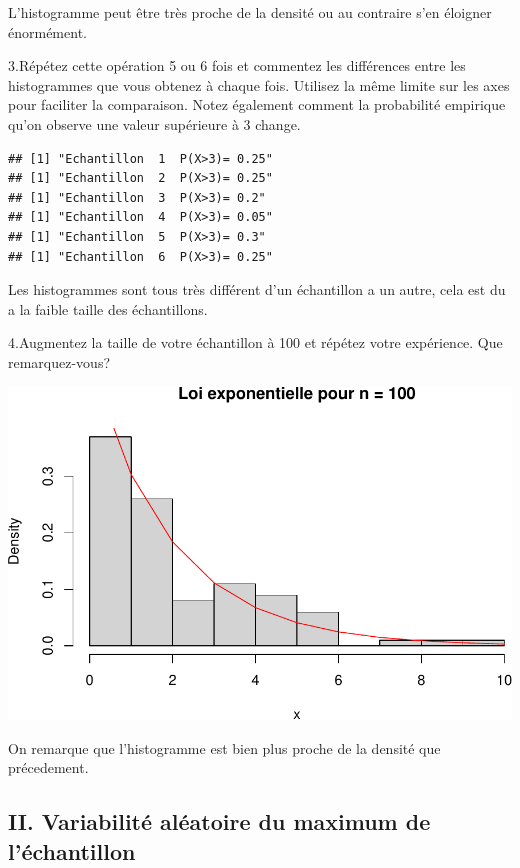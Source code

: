 \documentclass[
]{article}
\begin{document}
L'histogramme peut être très proche de la densité ou au contraire s'en
éloigner énormément.

3.Répétez cette opération 5 ou 6 fois et commentez les différences entre
les histogrammes que vous obtenez à chaque fois. Utilisez la même limite
sur les axes pour faciliter la comparaison. Notez également comment la
probabilité empirique qu'on observe une valeur supérieure à 3 change.

\begin{verbatim}
## [1] "Echantillon  1  P(X>3)= 0.25"
## [1] "Echantillon  2  P(X>3)= 0.25"
## [1] "Echantillon  3  P(X>3)= 0.2"
## [1] "Echantillon  4  P(X>3)= 0.05"
## [1] "Echantillon  5  P(X>3)= 0.3"
## [1] "Echantillon  6  P(X>3)= 0.25"
\end{verbatim}

Les histogrammes sont tous très différent d'un échantillon a un autre,
cela est du a la faible taille des échantillons.

4.Augmentez la taille de votre échantillon à 100 et répétez votre
expérience. Que remarquez-vous?

\includegraphics{tp2_files/figure-latex/unnamed-chunk-2-1.pdf}

On remarque que l'histogramme est bien plus proche de la densité que
précedement.

\hypertarget{ii.-variabilituxe9-aluxe9atoire-du-maximum-de-luxe9chantillon}{%
\subsection{II. Variabilité aléatoire du maximum de
l'échantillon}\label{ii.-variabilituxe9-aluxe9atoire-du-maximum-de-luxe9chantillon}}
\end{document}
